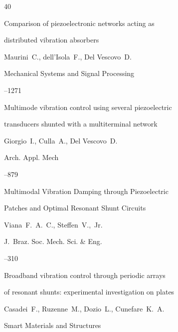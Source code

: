\begin{thebibliography}{40}

\paper Comparison of piezoelectronic networks acting as

distributed vibration absorbers

\by Maurini~C., dell'Isola~F., Del Vescovo~D.

\jour Mechanical Systems and Signal Processing




--1271





\paper Multimode vibration control using several piezoelectric

transducers shunted with a multiterminal network

\by Giorgio~I., Culla~A., Del Vescovo~D.

\jour Arch. Appl. Mech




--879





\paper Multimodal Vibration Damping through Piezoelectric

Patches and Optimal Resonant Shunt Circuits

\by Viana~F.~A.~C., Steffen~V.,~Jr.

\jour  J.~Braz. Soc. Mech. Sci. \& Eng. 




--310





\paper Broadband vibration control through periodic arrays

of resonant shunts: experimental investigation on plates

\by Casadei~F., Ruzenne~M., Dozio~L., Cunefare~K.~A.

\jour Smart Materials and Structures


\end{thebibliography}
